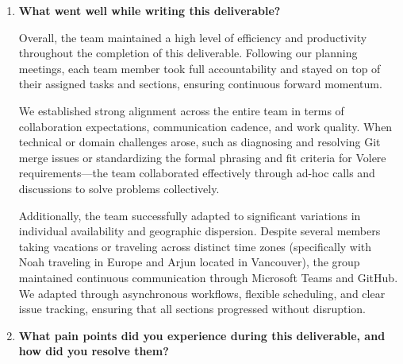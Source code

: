 \documentclass[12pt]{article}
\begin{document}
\begin{enumerate}
  \item \textbf{What went well while writing this deliverable?}

  Overall, the team maintained a high level of efficiency and productivity throughout the completion of this deliverable. Following our planning meetings, each team member took full accountability and stayed on top of their assigned tasks and sections, ensuring continuous forward momentum.

  We established strong alignment across the entire team in terms of collaboration expectations, communication cadence, and work quality. When technical or domain challenges arose, such as diagnosing and resolving Git merge issues or standardizing the formal phrasing and fit criteria for Volere requirements---the team collaborated effectively through ad-hoc calls and discussions to solve problems collectively.

  Additionally, the team successfully adapted to significant variations in individual availability and geographic dispersion. Despite several members taking vacations or traveling across distinct time zones (specifically with Noah traveling in Europe and Arjun located in Vancouver), the group maintained continuous communication through Microsoft Teams and GitHub. We adapted through asynchronous workflows, flexible scheduling, and clear issue tracking, ensuring that all sections progressed without disruption.

  \item \textbf{What pain points did you experience during this deliverable, and how did you resolve them?}


\end{enumerate}
\end{document}
